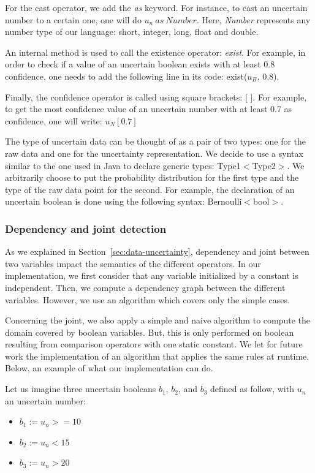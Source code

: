 For the cast operator, we add the \textit{as} keyword.
For instance, to cast an uncertain number to a certain one, one will do $u_n\ as\ Number$.
Here, \textit{Number} represents any number type of our language: short, integer, long, float and double.

An internal method is used to call the existence operator: \textit{exist}.
For example, in order to check if a value of an uncertain boolean exists with at least 0.8 confidence, one needs to add the following line in its code: exist($u_B$, 0.8).

Finally, the confidence operator is called using square brackets: [ ].
For example, to get the most confidence value of an uncertain number with at least 0.7 as confidence, one will write: $u_N[0.7]$

\bigskip
The type of uncertain data can be thought of as a pair of two types: one for the raw data and one for the uncertainty representation.
We decide to use a syntax similar to the one used in Java to declare generic types: Type1$<$Type2$>$.
We arbitrarily choose to put the probability distribution for the first type and the type of the raw data point for the second.
For example, the declaration of an uncertain boolean is done using the following syntax: Bernoulli$<$bool$>$.

\subsubsection{Dependency and joint detection}
As we explained in Section~\ref{sec:data-uncertainty}, dependency and joint between two variables impact the semantics of the different operators.
In our implementation, we first consider that any variable initialized by a constant is independent.
Then, we compute a dependency graph between the different variables.
However, we use an algorithm which covers only the simple cases.

Concerning the joint, we also apply a simple and naive algorithm to compute the domain covered by boolean variables.
But, this is only performed on boolean resulting from comparison operators with one static constant.
We let for future work the implementation of an algorithm that applies the same rules at runtime.
Below, an example of what our implementation can do.

Let us imagine three uncertain booleans $b_1$, $b_2$, and $b_3$ defined as follow, with $u_n$ an uncertain number: 
\begin{itemize}
	\item $b_1 := u_n >= 10$
	\item $b_2 := u_n < 15$
	\item $b_3 := u_n > 20$
\end{itemize}

